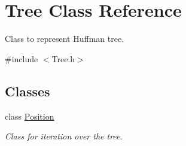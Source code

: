 \hypertarget{class_tree}{}\section{Tree Class Reference}
\label{class_tree}


Class to represent Huffman tree.  




{\ttfamily \#include $<$Tree.\+h$>$}

\subsection*{Classes}
\begin{DoxyCompactItemize}
\item 
class \mbox{\hyperlink{class_tree_1_1_position}{Position}}
\begin{DoxyCompactList}\small\item\em Class for iteration over the tree. \end{DoxyCompactList}\end{DoxyCompactItemize}

